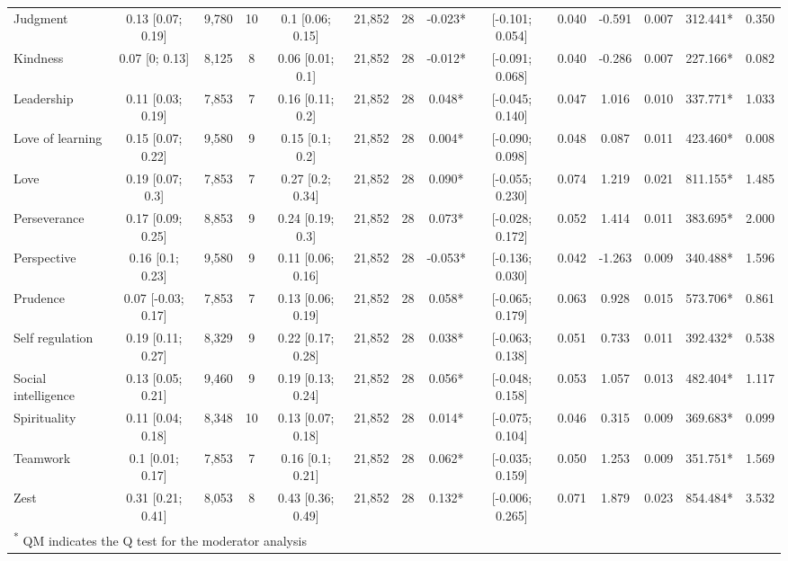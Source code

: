 \documentclass[
  man,floatsintext]{apa6}
\begin{document}
\begin{table}
{\begin{tabular}[t]{lccccccccccccc}
Judgment & 0.13 [0.07; 0.19] & 9,780 & 10 & 0.1 [0.06; 0.15] & 21,852 & 28 & -0.023* & {}[-0.101;  0.054] & 0.040 & -0.591 & 0.007 & 312.441* & 0.350\\
Kindness & 0.07 [0; 0.13] & 8,125 & 8 & 0.06 [0.01; 0.1] & 21,852 & 28 & -0.012* & {}[-0.091;  0.068] & 0.040 & -0.286 & 0.007 & 227.166* & 0.082\\
Leadership & 0.11 [0.03; 0.19] & 7,853 & 7 & 0.16 [0.11; 0.2] & 21,852 & 28 & 0.048* & {}[-0.045;  0.140] & 0.047 & 1.016 & 0.010 & 337.771* & 1.033\\
Love of learning & 0.15 [0.07; 0.22] & 9,580 & 9 & 0.15 [0.1; 0.2] & 21,852 & 28 & 0.004* & {}[-0.090;  0.098] & 0.048 & 0.087 & 0.011 & 423.460* & 0.008\\
\addlinespace
Love & 0.19 [0.07; 0.3] & 7,853 & 7 & 0.27 [0.2; 0.34] & 21,852 & 28 & 0.090* & {}[-0.055;  0.230] & 0.074 & 1.219 & 0.021 & 811.155* & 1.485\\
Perseverance & 0.17 [0.09; 0.25] & 8,853 & 9 & 0.24 [0.19; 0.3] & 21,852 & 28 & 0.073* & {}[-0.028;  0.172] & 0.052 & 1.414 & 0.011 & 383.695* & 2.000\\
Perspective & 0.16 [0.1; 0.23] & 9,580 & 9 & 0.11 [0.06; 0.16] & 21,852 & 28 & -0.053* & {}[-0.136;  0.030] & 0.042 & -1.263 & 0.009 & 340.488* & 1.596\\
Prudence & 0.07 [-0.03; 0.17] & 7,853 & 7 & 0.13 [0.06; 0.19] & 21,852 & 28 & 0.058* & {}[-0.065;  0.179] & 0.063 & 0.928 & 0.015 & 573.706* & 0.861\\
Self regulation & 0.19 [0.11; 0.27] & 8,329 & 9 & 0.22 [0.17; 0.28] & 21,852 & 28 & 0.038* & {}[-0.063;  0.138] & 0.051 & 0.733 & 0.011 & 392.432* & 0.538\\
\addlinespace
Social intelligence & 0.13 [0.05; 0.21] & 9,460 & 9 & 0.19 [0.13; 0.24] & 21,852 & 28 & 0.056* & {}[-0.048;  0.158] & 0.053 & 1.057 & 0.013 & 482.404* & 1.117\\
Spirituality & 0.11 [0.04; 0.18] & 8,348 & 10 & 0.13 [0.07; 0.18] & 21,852 & 28 & 0.014* & {}[-0.075;  0.104] & 0.046 & 0.315 & 0.009 & 369.683* & 0.099\\
Teamwork & 0.1 [0.01; 0.17] & 7,853 & 7 & 0.16 [0.1; 0.21] & 21,852 & 28 & 0.062* & {}[-0.035;  0.159] & 0.050 & 1.253 & 0.009 & 351.751* & 1.569\\
Zest & 0.31 [0.21; 0.41] & 8,053 & 8 & 0.43 [0.36; 0.49] & 21,852 & 28 & 0.132* & {}[-0.006;  0.265] & 0.071 & 1.879 & 0.023 & 854.484* & 3.532\\
\bottomrule
\multicolumn{14}{l}{\textsuperscript{*} QM indicates the Q test for the moderator analysis}\\
\end{tabular}}
\end{table}
\end{document}
